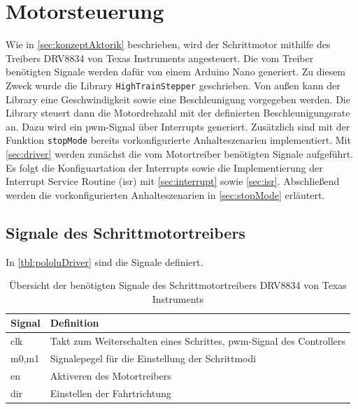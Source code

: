 \section{Motorsteuerung}
\label{sec:motorsteuerung}

Wie in \autoref{sec:konzeptAktorik} beschrieben, wird der Schrittmotor mithilfe des Treibers DRV8834 von Texas Instruments angesteuert. Die vom Treiber benötigten Signale werden dafür von einem Arduino Nano generiert. Zu diesem Zweck wurde die Library \texttt{HighTrainStepper} geschrieben. Von außen kann der Library  eine Geschwindigkeit sowie eine Beschleunigung vorgegeben werden. Die Library steuert dann die Motordrehzahl mit der definierten Beschleunigungsrate an. Dazu wird ein \acrshort{pwm}-Signal über Interrupts generiert. Zusätzlich sind mit der Funktion \texttt{stopMode} bereits vorkonfigurierte Anhalteszenarien implementiert. Mit \autoref{sec:driver} werden zunächst die vom Motortreiber benötigten Signale aufgeführt. Es folgt die Konfiguartation der Interrupts sowie die Implementierung der Interrupt Service Routine (\acrshort{isr}) mit \autoref{sec:interrupt} sowie \autoref{sec:isr}. Abschließend  werden die vorkonfigurierten Anhalteszenarien in \autoref{sec:stopMode} erläutert.


\subsection{Signale des Schrittmotortreibers}
\label{sec:driver}

In \autoref{tbl:pololuDriver} sind die Signale definiert. 

\begin{table}[h]
	\begin{center}
		\begin{tabular}[h]{l|l}
			\textbf{Signal} & \textbf{Definition} \\
			\hline
			clk & Takt zum Weiterschalten eines Schrittes, \acrshort{pwm}-Signal des Controllers\\
			\hline
			m0,m1 & Signalepegel für die Einstellung der Schrittmodi\\
			\hline
			en & Aktiveren des Motortreibers\\
			\hline
			dir & Einstellen der Fahrtrichtung\\
		\end{tabular}
	\end{center}
	\caption{Übersicht der benötigten Signale des Schrittmotortreibers DRV8834 von Texas Instruments}
	\label{tbl:pololuDriver}
\end{table}

